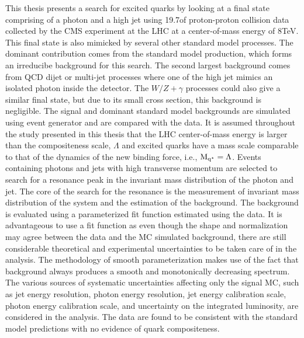 This thesis presents a search for excited quarks by looking at a final state comprising of a photon and a high \pt jet using 19.7\fbinv of proton-proton 
collision data collected by the CMS experiment at the LHC at a center-of-mass energy of 8\unit{TeV}. This final state is also mimicked by several other 
standard model processes. The dominant contribution comes from the standard model \gamjet production, which forms 
an irreducibe background for this search. The second largest background comes from QCD dijet or multi-jet processes where one of the high \pt jet mimics an 
isolated photon inside the detector. The $W/Z+\gamma$ processes could also give a similar final state, but due to its small cross section, this background is 
negligible. The \qstar signal and dominant standard model backgrounds are simulated using \pythia event generator and are compared with the data. It is assumed 
throughout the study presented in this thesis that the LHC center-of-mass energy is larger than the compositeness scale, $\Lambda$ and excited quarks have a mass 
scale comparable to that of the dynamics of the new binding force, i.e., $\mathrm{M_{q^\star}}=\Lambda$. Events containing photons and jets with high transverse momentum are 
selected to search for a resonance peak in the invariant mass distribution 
of the photon and jet. The core of the search for the \qstar resonance is the measurement of invariant mass distribution of the \gamjet system and the estimation of 
the background. The background is evaluated using a parameterized fit function estimated using the data. It is advantageous to use a fit function as even though the
shape and normalization may agree between the data and the MC simulated background, there are still considerable theoretical and experimental uncertainties to be 
taken care of in the analysis. The methodology of smooth parameterization makes use of the fact that \gamjet background always produces a smooth and monotonically
decreasing spectrum. The various sources of systematic uncertainties affecting only the signal MC, such as jet energy resolution, photon energy resolution, jet 
energy calibration scale, photon energy calibration scale, and uncertainty on the integrated luminosity, are considered in the analysis.
The data are found to be consistent with the standard model predictions with no evidence of quark compositeness. 

